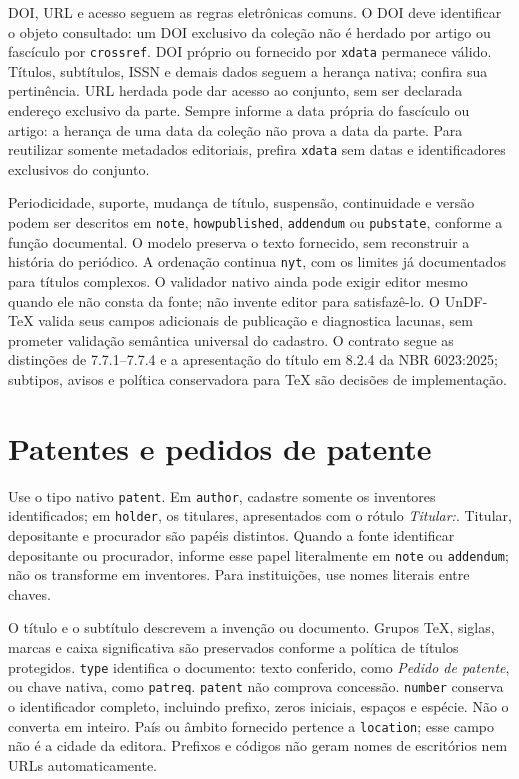 DOI, URL e acesso seguem as regras eletrônicas comuns. O DOI deve identificar
o objeto consultado: um DOI exclusivo da coleção não é herdado por artigo ou
fascículo por \texttt{crossref}. DOI próprio ou fornecido por \texttt{xdata}
permanece válido. Títulos, subtítulos, ISSN e demais dados seguem a herança
nativa; confira sua pertinência. URL herdada pode dar acesso ao conjunto,
sem ser declarada endereço exclusivo da parte. Sempre informe a data própria
do fascículo ou artigo: a herança de uma data da coleção não prova a data da
parte. Para reutilizar somente metadados editoriais, prefira \texttt{xdata}
sem datas e identificadores exclusivos do conjunto.

Periodicidade, suporte, mudança de título, suspensão, continuidade e versão
podem ser descritos em \texttt{note}, \texttt{howpublished}, \texttt{addendum}
ou \texttt{pubstate}, conforme a função documental. O modelo preserva o texto
fornecido, sem reconstruir a história do periódico. A ordenação continua
\texttt{nyt}, com os limites já documentados para títulos complexos.
O validador nativo ainda pode exigir editor mesmo quando ele não consta da
fonte; não invente editor para satisfazê-lo. O UnDF-TeX valida seus campos
adicionais de publicação e diagnostica lacunas, sem prometer validação semântica
universal do cadastro. O contrato segue as distinções de 7.7.1--7.7.4 e a
apresentação do título em 8.2.4 da NBR 6023:2025; subtipos, avisos e política
conservadora para TeX são decisões de implementação.


\section{Patentes e pedidos de patente}

Use o tipo nativo \texttt{patent}. Em \texttt{author}, cadastre somente os
inventores identificados; em \texttt{holder}, os titulares, apresentados com
o rótulo \emph{Titular:}. Titular, depositante e procurador são papéis distintos.
Quando a fonte identificar depositante ou procurador, informe esse papel
literalmente em \texttt{note} ou \texttt{addendum}; não os transforme em
inventores. Para instituições, use nomes literais entre chaves.

O título e o subtítulo descrevem a invenção ou documento. Grupos TeX, siglas,
marcas e caixa significativa são preservados conforme a política de títulos
protegidos. \texttt{type} identifica o documento: texto conferido, como
\emph{Pedido de patente}, ou chave nativa, como \texttt{patreq}.
\texttt{patent} não comprova concessão. \texttt{number} conserva o identificador
completo, incluindo prefixo, zeros iniciais, espaços e espécie. Não o converta
em inteiro. País ou âmbito fornecido pertence a \texttt{location}; esse campo
não é a cidade da editora. Prefixos e códigos não geram nomes de escritórios
nem URLs automaticamente.

